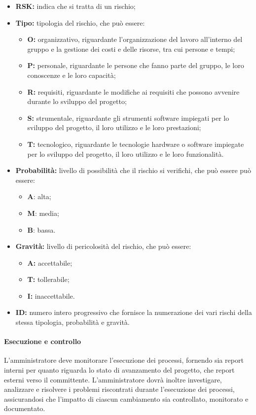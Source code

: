 			\begin{itemize}
				\item \textbf{RSK:} indica che si tratta di un rischio;
				\item \textbf{Tipo:} tipologia del rischio, che può essere:
				\begin{itemize}
					\item \textbf{O:} organizzativo, riguardante l'organizzazione del lavoro all'interno del gruppo e la gestione dei costi e delle risorse, tra cui persone e tempi;
					\item \textbf{P:} personale, riguardante le persone che fanno parte del gruppo, le loro conoscenze e le loro capacità;
					\item \textbf{R:} requisiti, riguardante le modifiche ai requisiti che possono avvenire durante lo sviluppo del progetto;
					\item \textbf{S:} strumentale, riguardante gli strumenti software impiegati per lo sviluppo del progetto, il loro utilizzo e le loro prestazioni;
					\item \textbf{T:} tecnologico, riguardante le tecnologie hardware o software impiegate per lo sviluppo del progetto, il loro utilizzo e le loro funzionalità.
				\end{itemize}
				\item \textbf{Probabilità:} livello di possibilità che il rischio si verifichi, che può essere può essere:
				\begin{itemize}
					\item \textbf{A}: alta;
					\item \textbf{M}: media;
					\item \textbf{B}: bassa.
				\end{itemize}
				\item \textbf{Gravità:} livello di pericolosità del rischio, che può essere:
				\begin{itemize}
					\item \textbf{A:} accettabile;
					\item \textbf{T:} tollerabile;
					\item \textbf{I:} inaccettabile.
				\end{itemize}
				\item \textbf{ID:} numero intero progressivo che fornisce la numerazione dei vari rischi della stessa tipologia, probabilità e gravità.

			\end{itemize}

		\paragraph{Esecuzione e controllo}
			L'amministratore deve monitorare l'esecuzione dei processi, fornendo sia report interni per quanto riguarda lo stato di avanzamento del progetto, che report esterni verso il committente.
			L'amministratore dovrà inoltre investigare, analizzare e risolvere i problemi riscontrati durante l'esecuzione dei processi, assicurandosi che l'impatto di ciascun cambiamento sia controllato, monitorato e documentato.


